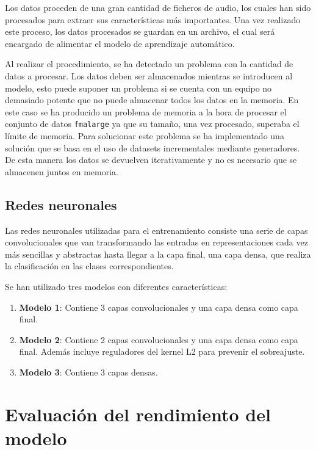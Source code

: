 Los datos proceden de una gran cantidad de ficheros de audio, los cuales han sido procesados para extraer sus características más importantes. Una vez realizado este proceso, los datos procesados se guardan en un archivo, el cual será encargado de alimentar el modelo de aprendizaje automático.

Al realizar el procedimiento, se ha detectado un problema con la cantidad de datos a procesar. Los datos deben ser almacenados mientras se introducen al modelo, esto puede suponer un problema si se cuenta con un equipo no demasiado potente que no puede almacenar todos los datos en la memoria. 
En este caso se ha producido un problema de memoria a la hora de procesar el conjunto de datos \texttt{fma\textunderscore large} ya que su tamaño, una vez procesado, superaba el límite de memoria. Para solucionar este problema se ha implementado una solución que se basa en el uso de datasets incrementales mediante generadores. De esta manera los datos se devuelven iterativamente y no es necesario que se almacenen juntos en memoria.

\subsection{Redes neuronales}

Las redes neuronales utilizadas para el entrenamiento consiste una serie de capas convolucionales que van transformando las entradas en representaciones cada vez más sencillas y abstractas hasta llegar a la capa final, una capa densa, que realiza la clasificación en las clases correspondientes.

Se han utilizado tres modelos con diferentes características:

\begin{enumerate}
\tightlist

\item \textbf{Modelo 1}: Contiene 3 capas convolucionales y una capa densa como capa final.

\item \textbf{Modelo 2}: Contiene 2 capas convolucionales y una capa densa como capa final. Además incluye reguladores del kernel L2 para prevenir el sobreajuste.

\item \textbf{Modelo 3}: Contiene 3 capas densas.

\end{enumerate}

\section{Evaluación del rendimiento del modelo}

